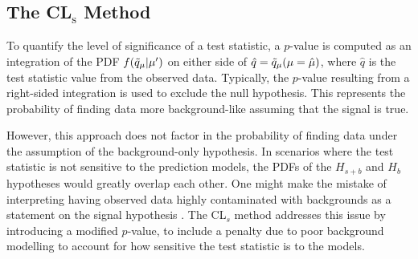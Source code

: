 \subsection{The CL$_{\mathrm{s}}$ Method}
\label{sec:cls}

To quantify the level of significance of a test statistic, a $p$-value is computed as an integration of the PDF $f(\Tilde{q}_{\mu}|\mu^{\prime})$ on either side of $\hat{q} = \Tilde{q}_{\mu}(\mu = \hat{\mu}) $, where $\hat{q}$ is the test statistic value from the observed data.
Typically, the $p$-value resulting from a right-sided integration is used to exclude the null hypothesis.
This represents the probability of finding data more background-like assuming that the signal is true.



However, this approach does not factor in the probability of finding data under the assumption of the background-only hypothesis.
In scenarios where the test statistic is not sensitive to the prediction models, the PDFs of the $H_{s+b}$ and $H_b$ hypotheses would greatly overlap each other.
One might make the mistake of interpreting having observed data highly contaminated with backgrounds as a statement on the signal hypothesis \cite{CLs_Read}.
The CL$_s$ method addresses this issue by introducing a modified $p$-value, to include a penalty due to poor background modelling to account for how sensitive the test statistic is to the models.

